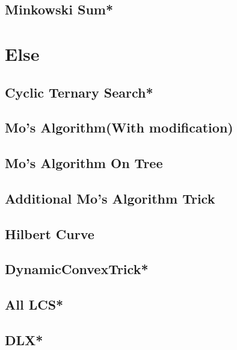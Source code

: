 \subsection{Minkowski Sum*} %



\section{Else}
\subsection{Cyclic Ternary Search*} %

\subsection{Mo's Algorithm(With modification)}

\subsection{Mo's Algorithm On Tree}

\subsection{Additional Mo's Algorithm Trick}

\subsection{Hilbert Curve}

\subsection{DynamicConvexTrick*} %

% 
\subsection{All LCS*} %

\subsection{DLX*} %

